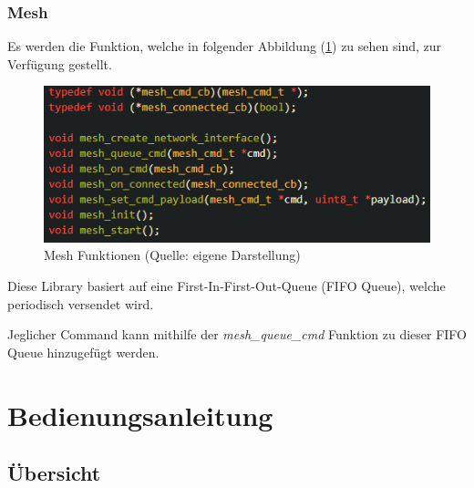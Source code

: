 \subsubsection{Mesh}\label{sec:own-libraries-mesh}

Es werden die Funktion, welche in folgender Abbildung (\ref{abb:mesh_functions}) zu sehen sind, zur Verfügung gestellt.

\begin{figure}[H]
    \begin{center}
        \includegraphics[scale=1]{images/mesh_functions.png}
        \caption{Mesh Funktionen (Quelle: eigene Darstellung)}
        \label{abb:mesh_functions}
    \end{center}
\end{figure}

Diese Library basiert auf eine First-In-First-Out-Queue (FIFO Queue), welche periodisch versendet wird. 

Jeglicher Command kann mithilfe der \textit{mesh\_queue\_cmd} Funktion zu dieser FIFO Queue hinzugefügt werden.




\section{Bedienungsanleitung}

\subsection{Übersicht}

